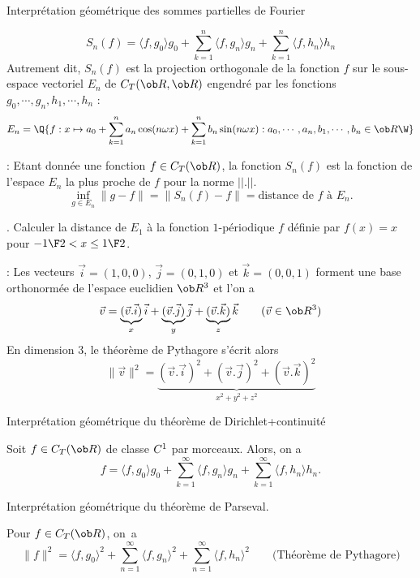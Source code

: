 \Concept Interpr\'etation g\'eom\'etrique des sommes partielles de Fourier


$$
S_n(f)=\langle f,g_0\rangle g_0+\sum_{k=1}^n\langle f,g_n\rangle g_n
+\sum_{k=1}^n\langle f,h_n\rangle h_n
$$ 
Autrement dit, $S_n(f)$ est la projection orthogonale de la fonction $f$ 
sur le sous-espace vectoriel $E_n$ 
de $\sc C_T(\ob R,\ob R)$ engendr\'e par les fonctions $g_0,\cdots, g_n, h_1,\cdots, h_n$ : 
$$
E_n=\Q\{f:x\mapsto a_0+\sum_{k=1}^na_n\cos(n\omega x)+\sum_{k=1}^nb_n\sin(n\omega x):
a_0,\cdots,a_n,b_1,\cdots,b_n\in\ob R\W\}
$$ 



\Remarque : Etant donn\'ee une fonction $f\in\sc C_T(\ob R)$, 
la fonction $S_n(f)$ est la fonction de l'espace $E_n$ la plus proche de $f$ pour la norme $||.||$. 
$$
\inf_{g\in E_n} \|g-f\|=\|S_n(f)-f\|=\mbox{distance de $f$ \`a $E_n$}. 
$$

\Exemple. Calculer la distance de $E_1$ \`a la fonction $1$-p\'eriodique $f$ 
d\'efinie par $f(x)=x$ pour $-{1\F2}<x\le{1\F2}$. 
\bigskip

\Rappel : Les vecteurs $\vec i=(1,0,0)$, $\vec j=(0,1,0)$ et $\vec k=(0,0,1)$ 
forment une base orthonorm\'ee de l'espace euclidien $\ob R^3$ et l'on a 
$$
\vec v=\underbrace{(\vec v.\vec i)}_{x}\vec i+\underbrace{(\vec v.\vec j)}_{y}\vec j
+\underbrace{(\vec v.\vec k)}_{z}\vec k\qquad(\vec v\in\ob R^3)
$$
En dimension $3$, le th\'eor\`eme de Pythagore s'\'ecrit alors
$$
\|\vec v\|^2=\underbrace{(\vec v.\vec i)^2+(\vec v.\vec j)^2+(\vec v.\vec k)^2}_{x^2+y^2+z^2}
$$ 


\Concept Interpr\'etation g\'eom\'etrique du th\'eor\`eme de Dirichlet+continuit\'e
 
Soit $f\in\sc C_T(\ob R)$ de classe $\sc C^1$ par morceaux. Alors, on a 
$$
f=\langle f,g_0\rangle g_0+\sum_{k=1}^\infty\langle f,g_n\rangle g_n
+\sum_{k=1}^\infty\langle f,h_n\rangle h_n.
$$ 


\Concept Interpr\'etation g\'eom\'etrique du th\'eor\`eme de Parseval. 

Pour $f\in\sc C_T(\ob R)$, on~a 
$$
\|f\|^2=\langle f,g_0\rangle^2+\sum_{n=1}^\infty\langle f,g_n\rangle^2
+\sum_{n=1}^\infty\langle f,h_n\rangle^2\qquad \mbox{(Th\'eor\`eme de Pythagore)}
$$









%

